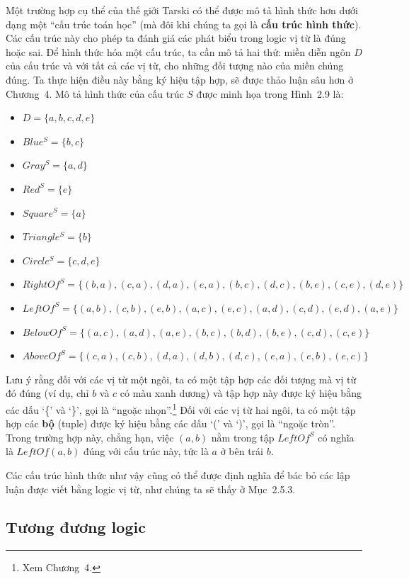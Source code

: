 Một trường hợp cụ thể của thế giới Tarski có thể được mô tả hình thức hơn dưới dạng một ``cấu trúc toán học'' (mà đôi khi chúng ta gọi là \textbf{cấu trúc hình thức}). Các cấu trúc này cho phép ta đánh giá các phát biểu trong logic vị từ là đúng hoặc sai. Để hình thức hóa một cấu trúc, ta cần mô tả hai thứ: miền diễn ngôn $D$ của cấu trúc và với tất cả các vị từ, cho những đối tượng nào của miền chúng đúng. Ta thực hiện điều này bằng ký hiệu tập hợp, sẽ được thảo luận sâu hơn ở Chương~4. Mô tả hình thức của cấu trúc $S$ được minh họa trong Hình~2.9 là:
\begin{itemize}
\item $D = \{a, b, c, d, e\}$
\item $Blue^S = \{b, c\}$
\item $Gray^S = \{a, d\}$
\item $Red^S = \{e\}$
\item $Square^S = \{a\}$
\item $Triangle^S = \{b\}$
\item $Circle^S = \{c, d, e\}$
\item $RightOf^S = \{(b,a), (c,a), (d,a), (e,a), (b,c), (d,c), (b,e), (c,e), (d,e)\}$
\item $LeftOf^S = \{(a,b), (c,b), (e,b), (a,c), (e,c), (a,d), (c,d), (e,d), (a,e)\}$
\item $BelowOf^S = \{(a,c), (a,d), (a,e), (b,c), (b,d), (b,e), (c,d), (c,e)\}$
\item $AboveOf^S = \{(c,a), (c,b), (d,a), (d,b), (d,c), (e,a), (e,b), (e,c)\}$
\end{itemize}

Lưu ý rằng đối với các vị từ một ngôi, ta có một tập hợp các đối tượng mà vị từ đó đúng (ví dụ, chỉ $b$ và $c$ có màu xanh dương) và tập hợp này được ký hiệu bằng các dấu `\{' và `\}', gọi là ``ngoặc nhọn''.\footnote{Xem Chương~4.} Đối với các vị từ hai ngôi, ta có một tập hợp các \textbf{bộ} (tuple) được ký hiệu bằng các dấu `(' và `)', gọi là ``ngoặc tròn''. Trong trường hợp này, chẳng hạn, việc $(a,b)$ nằm trong tập $LeftOf^S$ có nghĩa là $LeftOf(a,b)$ đúng với cấu trúc này, tức là $a$ ở bên trái $b$.

Các cấu trúc hình thức như vậy cũng có thể được định nghĩa để bác bỏ các lập luận được viết bằng logic vị từ, như chúng ta sẽ thấy ở Mục~2.5.3.

\subsection{Tương đương logic}

